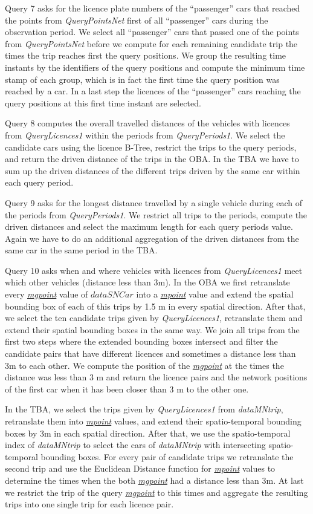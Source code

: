 \documentclass[a4paper]{article}
\newcommand{\dt}[1]{\textsl{\underline{#1}}}
\begin{document}
Query 7 asks for the licence plate numbers of the ``passenger'' cars that
reached the points from \textit{QueryPointsNet} first of all ``passenger'' cars
during the observation period. We select all ``passenger'' cars that passed one
of the points from \textit{QueryPointsNet} before we compute for each remaining
candidate trip the times the trip reaches first the query positions. We group
the resulting time instants by the identifiers of the query positions and compute
the minimum time stamp of each group, which is in fact the first time the query
position was reached by a car. In a last step the licences of the ``passenger''
cars reaching the query positions at this first time instant are selected.

Query 8 computes the overall travelled distances of the vehicles with licences from
\textit{QueryLicences1} within the periods from \textit{QueryPeriods1}. We select
the candidate cars using the licence B-Tree, restrict the trips to the query
periods, and return the driven distance of the trips in the OBA. In the TBA we
have to sum up the driven distances of the different trips driven by the same
car within each query period.

Query 9 asks for the longest distance travelled by a single vehicle during each
of the periods from \textit{QueryPeriods1}. We restrict all trips to the periods,
compute the driven distances and select the maximum length for each query periods value.
Again we have to do an additional aggregation of the driven distances from the
same car in the same period in the TBA.

Query 10 asks when and where vehicles with licences from \textit{QueryLicences1}
meet which other vehicles (distance less than 3m). In the OBA we first retranslate
every \dt{mgpoint} value of $dataSNCar$ into a \dt{mpoint} value and extend the
spatial bounding box of each of this trips by 1.5 m in every spatial direction.
After that, we select the ten candidate trips given by \textit{QueryLicences1},
retranslate them and extend their spatial bounding boxes in the same way. We join all trips from the
first two steps where the extended bounding boxes intersect and filter the
candidate pairs that have different licences and sometimes a distance less than
3m to each other. We compute the position of the \dt{mgpoint} at the
times the distance was less than 3 m and return the licence pairs and the
network positions of the first car when it has been closer than 3 m to the other
one.

In the TBA, we select the trips given by \textit{QueryLicences1} from
\textit{dataMNtrip}, retranslate them into \dt{mpoint} values, and extend their
spatio-temporal bounding boxes by 3m in each spatial direction. After that, we
use the spatio-temporal index of \textit{dataMNtrip} to select the cars of
\textit{dataMNtrip} with intersecting spatio-temporal bounding boxes. For every
pair of candidate trips we retranslate the second trip and use the Euclidean
Distance function for \dt{mpoint} values to determine the times when the both
\dt{mgpoint} had a distance less than 3m.
At last we restrict the trip of the query \dt{mgpoint} to this times and
aggregate the resulting trips into one single trip for each licence pair.
\end{document}
